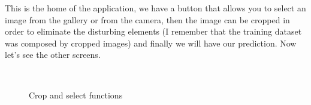 This is the home of the application, we have a button that allows you to select an image from the gallery or from the camera, then the image can be cropped in order to eliminate the disturbing elements (I remember that the training dataset was composed by cropped images) and finally we will have our prediction. Now let's see the other screens.
\begin{figure}[h!]
\centering
{}%
\\

\caption{Crop and select functions}
\label{some example}
\end{figure}